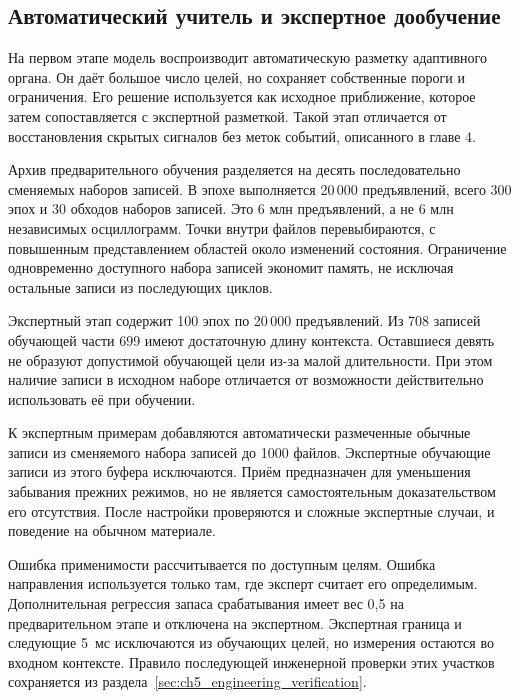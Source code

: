 \subsection{Автоматический учитель и экспертное дообучение}

На первом этапе модель воспроизводит автоматическую
разметку адаптивного органа. Он даёт большое число целей,
но сохраняет собственные пороги и ограничения.
Его решение используется как исходное приближение,
которое затем сопоставляется с экспертной разметкой.
Такой этап отличается от восстановления скрытых сигналов
без меток событий, описанного в главе 4.

{}

Архив предварительного обучения разделяется на десять
последовательно сменяемых наборов записей. В эпохе выполняется
20\,000 предъявлений, всего 300 эпох и 30 обходов наборов записей.
Это 6 млн предъявлений, а не 6 млн независимых осциллограмм.
Точки внутри файлов перевыбираются, с повышенным
представлением областей около изменений состояния.
Ограничение одновременно доступного набора записей экономит память,
не исключая остальные записи из последующих циклов.

Экспертный этап содержит 100 эпох по 20\,000 предъявлений.
Из 708 записей обучающей части 699 имеют достаточную
длину контекста. Оставшиеся девять не образуют
допустимой обучающей цели из-за малой длительности.
При этом наличие записи в исходном наборе отличается
от возможности действительно использовать её при обучении.

К экспертным примерам добавляются автоматически размеченные
обычные записи из сменяемого набора записей до 1000 файлов.
Экспертные обучающие записи из этого буфера исключаются.
Приём предназначен для уменьшения забывания прежних режимов,
но не является самостоятельным доказательством его отсутствия.
После настройки проверяются и сложные экспертные случаи,
и поведение на обычном материале.

Ошибка применимости рассчитывается по доступным целям.
Ошибка направления используется только там,
где эксперт считает его определимым.
Дополнительная регрессия запаса срабатывания имеет вес 0,5
на предварительном этапе и отключена на экспертном.
Экспертная граница и следующие 5~мс исключаются
из обучающих целей, но измерения остаются во входном контексте.
Правило последующей инженерной проверки этих участков
сохраняется из раздела~\ref{sec:ch5_engineering_verification}.

